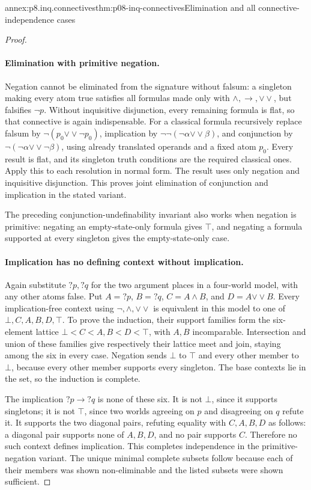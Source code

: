\begin{annexitem}{annex:p8.inq.connectives}{thm:p08-inq-connectives}{Elimination and all connective-independence cases}
\begin{proof}
\paragraph{Elimination with primitive negation.}
Negation cannot be eliminated from the signature without falsum:
a singleton making every atom true satisfies all formulas made only
with \(\land,\to,\mathbin{\vee\!\vee}\), but falsifies \(\neg p\).
Without inquisitive disjunction, every remaining formula is flat,
so that connective is again indispensable.
For a classical formula recursively replace falsum by
\(\neg(p_0\mathbin{\vee\!\vee}\neg p_0)\), implication by
\(\neg\neg(\neg\alpha\mathbin{\vee\!\vee}\beta)\), and conjunction
by \(\neg(\neg\alpha\mathbin{\vee\!\vee}\neg\beta)\), using
already translated operands and a fixed atom \(p_0\). Every result is
flat, and its singleton truth conditions are the required classical
ones. Apply this to each resolution in normal form. The result uses
only negation and inquisitive disjunction. This proves joint elimination
of conjunction and implication in the stated variant.

The preceding conjunction-undefinability invariant also works when
negation is primitive: negating an empty-state-only formula gives
\(\top\), and negating a formula supported at every singleton gives
the empty-state-only case.

\paragraph{Implication has no defining context without implication.}
Again substitute \(?p,?q\) for the two argument places in a four-world
model, with any other atoms false. Put \(A=?p\), \(B=?q\),
\(C=A\land B\), and \(D=A\mathbin{\vee\!\vee}B\).
Every implication-free context using
\(\neg,\land,\mathbin{\vee\!\vee}\) is equivalent in this model to
one of \(\bot,C,A,B,D,\top\). To prove the induction, their support
families form the six-element lattice
\(\bot<C<A,B<D<\top\), with \(A,B\) incomparable.
Intersection and union of these families give respectively their
lattice meet and join, staying among the six in every case.
Negation sends \(\bot\) to \(\top\) and every other member to
\(\bot\), because every other member supports every singleton.
The base contexts lie in the set, so the induction is complete.

The implication \(?p\to?q\) is none of these six. It is not
\(\bot\), since it supports singletons; it is not \(\top\), since
two worlds agreeing on \(p\) and disagreeing on \(q\) refute it.
It supports the two diagonal pairs, refuting equality with \(C,A,B,D\)
as follows: a diagonal pair supports none of \(A,B,D\), and no pair
supports \(C\). Therefore no such context defines implication.
This completes independence in the primitive-negation variant. The
unique minimal complete subsets follow because each of their members
was shown non-eliminable and the listed subsets were shown sufficient.
\end{proof}
\end{annexitem}

